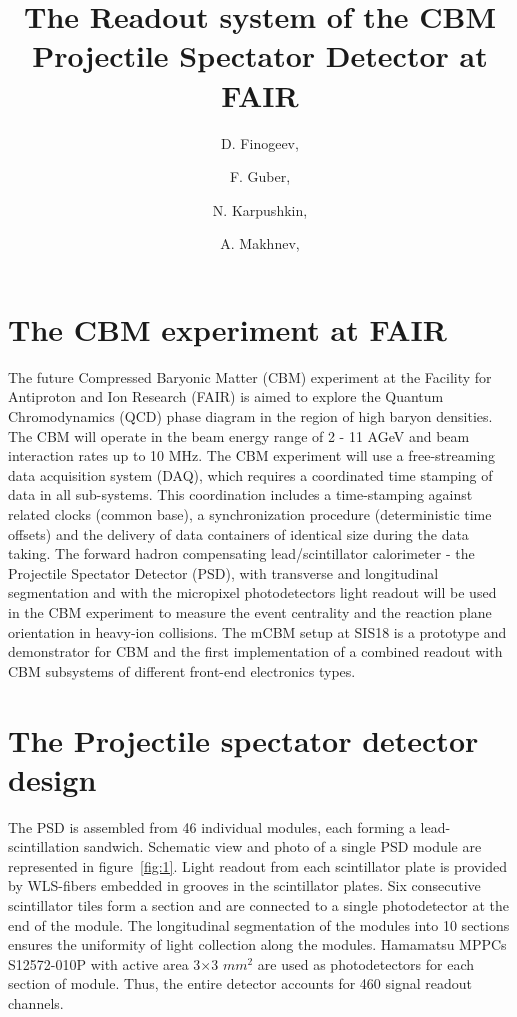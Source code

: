 \documentclass[a4paper,11pt]{article}
\title{The Readout system of the CBM Projectile Spectator Detector at FAIR}
\author[a,c,1]{D. Finogeev,\note{Corresponding author.}}
\author[a,b]{F. Guber,}
\author[a]{N. Karpushkin,}
\author[a]{A. Makhnev,}
\affiliation[a]{Institute for Nuclear Research RAS, Moscow, Russia,}
\affiliation[b]{Moscow Institute of Physics and Technology, Dolgoprudny, Moscow Region, Russia}
\affiliation[c]{National Research Nuclear University MEPhI, Moscow, Russia}
\affiliation[d]{ Joint Institute for Nuclear Research, Dubna, Russia}
\begin{document}
\maketitle
\flushbottom

\section{The CBM experiment at FAIR}
\label{sec:intro}
The future Compressed Baryonic Matter (CBM) experiment at the Facility for Antiproton and Ion Research (FAIR) is aimed to explore the Quantum Chromodynamics (QCD) phase diagram in the region of high baryon densities. The CBM will operate in the beam energy range of 2 - 11 AGeV and beam interaction rates up to 10 MHz. The CBM experiment will use a free-streaming data acquisition system (DAQ), which requires a coordinated time stamping of data in all sub-systems. This coordination includes a time-stamping against related clocks (common base), a synchronization procedure (deterministic time offsets) and the delivery of data containers of identical size during the data taking. The forward hadron compensating lead/scintillator calorimeter - the Projectile Spectator Detector (PSD), with transverse and longitudinal segmentation and with the micropixel photodetectors light readout will be used in the CBM experiment to measure the event centrality and the reaction plane orientation in heavy-ion collisions. The mCBM setup at SIS18 is a prototype and demonstrator for CBM and the first implementation of a combined readout with CBM subsystems of different front-end electronics types.


\section{The Projectile spectator detector design}
The PSD is assembled from 46 individual modules, each forming a lead-scintillation sandwich. Schematic view and photo of a single PSD module are represented in figure~\ref{fig:1}. Light readout from each scintillator plate is provided by WLS-fibers embedded in grooves in the scintillator plates. Six consecutive scintillator tiles form a section and are connected to a single photodetector at the end of the module. The longitudinal segmentation of the modules into 10 sections ensures the uniformity of light collection along the modules. Hamamatsu MPPCs S12572-010P with active area 3$\times$3 $mm^2$ are used as photodetectors for each section of module. 
Thus, the entire detector accounts for 460 signal readout channels.
\end{document}
